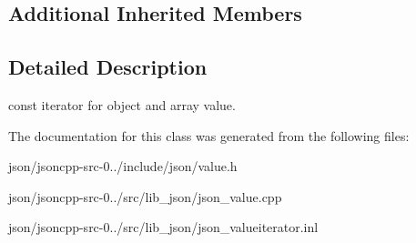 \subsection*{Additional Inherited Members}


\subsection{Detailed Description}
const iterator for object and array value. 



The documentation for this class was generated from the following files\+:\begin{DoxyCompactItemize}
\item 
json/jsoncpp-\/src-\/0../include/json/value.\+h\item 
json/jsoncpp-\/src-\/0../src/lib\+\_\+json/json\+\_\+value.\+cpp\item 
json/jsoncpp-\/src-\/0../src/lib\+\_\+json/json\+\_\+valueiterator.\+inl\end{DoxyCompactItemize}
